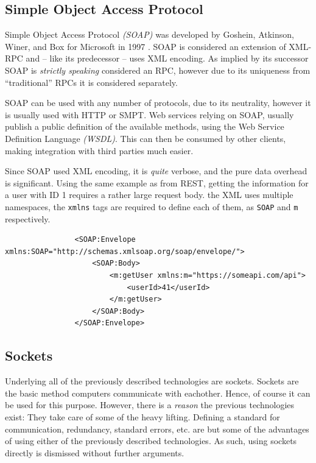 		\subsection{Simple Object Access Protocol}
			Simple Object Access Protocol \emph{(SOAP)} was developed by Goshein, Atkinson, Winer, and Box for Microsoft in 1997 \cite{soap_origin}. SOAP is considered an extension of XML-RPC and -- like its predecessor -- uses XML encoding. As implied by its successor SOAP is \emph{strictly speaking} considered an RPC, however due to its uniqueness from ``traditional'' RPCs it is considered separately.

			SOAP can be used with any number of protocols, due to its neutrality, however it is usually used with HTTP or SMPT. Web services relying on SOAP, usually publish a public definition of the available methods, using the Web Service Definition Language \emph{(WSDL)}. This can then be consumed by other clients, making integration with third parties much easier.

			Since SOAP used XML encoding, it is \emph{quite} verbose, and the pure data overhead is significant. Using the same example as from REST, getting the information for a user with ID 1 requires a rather large request body. the XML uses multiple namespaces, the \verb=xmlns= tags are required to define each of them, as \verb=SOAP= and \verb=m= respectively.

			\begin{verbatim}
				<SOAP:Envelope xmlns:SOAP="http://schemas.xmlsoap.org/soap/envelope/">
				    <SOAP:Body>
				        <m:getUser xmlns:m="https://someapi.com/api">
				            <userId>41</userId>
				        </m:getUser>
				    </SOAP:Body>
				</SOAP:Envelope>
			\end{verbatim}

		\subsection{Sockets}
			Underlying all of the previously described technologies are sockets. Sockets are the basic method computers communicate with eachother. Hence, of course it can be used for this purpose. However, there is a \emph{reason} the previous technologies exist: They take care of some of the heavy lifting. Defining a standard for communication, redundancy, standard errors, etc. are but some of the advantages of using either of the previously described technologies. As such, using sockets directly is dismissed without further arguments. 

